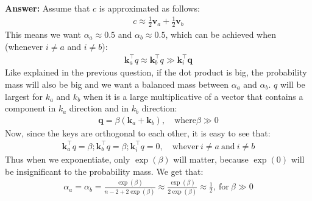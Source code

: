 \documentclass[letterpaper,12pt]{article}
\begin{document}
\begin{itemize}
	\textcolor{blue!70}{\textbf{Answer:} Assume that $c$ is approximated as follows:
	\begin{equation*}
		\begin{aligned}
			c \approx \frac{1}{2}\mathbf{v}_a + \frac{1}{2}\mathbf{v}_b
		\end{aligned}
	\end{equation*}
	This means we want $\alpha_a \approx 0.5$ and $\alpha_b \approx 0.5$, which can be achieved when (whenever $i \neq a$ and $i \neq b$):
	\begin{equation*}
		\begin{aligned}
			\mathbf{k}_a^\top q \approx \mathbf{k}_b^\top q \gg \mathbf{k}_i^\top \mathbf{q}
		\end{aligned}
	\end{equation*}
	Like explained in the previous question, if the dot product is big, the probability mass will also be big and we want a balanced mass between $\alpha_a$ and $\alpha_b$. $q$ will be largest for $k_a$ and $k_b$ when it is a large multiplicative of a vector that contains a component in $k_a$ direction and in $k_b$ direction:
	\begin{equation*}
		\begin{aligned}
			\mathbf{q} = \beta (\mathbf{k}_a + \mathbf{k}_b), \quad \text{where} \beta \gg 0
		\end{aligned}
	\end{equation*}
	Now, since the keys are orthogonal to each other, it is easy to see that:
	\begin{equation*}
		\begin{aligned}
			\mathbf{k}_a^\top q = \beta; \mathbf{k}_b^\top q = \beta; \mathbf{k}_i^\top q = 0, \quad \text{whever} \ i\neq a \ \text{and} \ i\neq b
		\end{aligned}
	\end{equation*}
	Thus when we exponentiate, only $\exp(\beta)$ will matter, because $\exp(0)$ will be insignificant to the probability mass. We get that:
	\begin{equation*}
		\begin{aligned}
			\alpha_a=\alpha_b=\frac{\exp(\beta)}{n-2+2\exp(\beta)} \approx \frac{\exp(\beta)}{2\exp(\beta)} \approx \frac{1}{2}, \ \text{for} \ \beta \gg 0
		\end{aligned}
	\end{equation*}
	}
	
	\end{itemize}	
	
	
	
\end{document}
